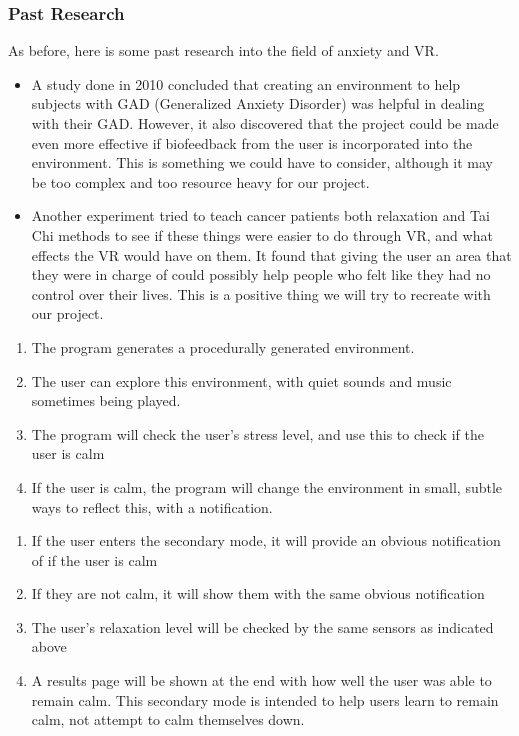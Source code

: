 \documentclass[a4paper,10pt]{article}
\begin{document}
\subsubsection{Past Research}
As before, here is some past research into the field of anxiety and VR.
\begin{itemize}
	\item A study done in 2010 concluded that creating an environment to help subjects with GAD (Generalized Anxiety Disorder) was helpful in dealing with their GAD.  However, it also discovered that the project could be made even more effective if biofeedback from the user is incorporated into the environment.  This is something we could have to consider, although it may be too complex and too resource heavy for our project. \cite{calmOne}
	\item Another experiment tried to teach cancer patients both relaxation and Tai Chi methods to see if these things were easier to do through VR, and what effects the VR would have on them.  It found that giving the user an area that they were in charge of could possibly help people who felt like they had no control over their lives. This is a positive thing we will try to recreate with our project.
\end{itemize}
\pagebreak


\begin{enumerate}
	\item The program generates a procedurally generated environment.
	\item The user can explore this environment, with quiet sounds and music sometimes being played.
	\item The program will check the user's stress level, and use this to check if the user is calm
	\item If the user is calm, the program will change the environment in small, subtle ways to reflect this, with a notification.
\end{enumerate}
\begin{enumerate}
	\item If the user enters the secondary mode, it will provide an obvious notification of if the user is calm
	\item If they are not calm, it will show them with the same obvious notification
	\item The user's relaxation level will be checked by the same sensors as indicated above
	\item A results page will be shown at the end with how well the user was able to remain calm.  This secondary mode is intended to help users learn to remain calm, not attempt to calm themselves down.
\end{enumerate}
\end{document}
